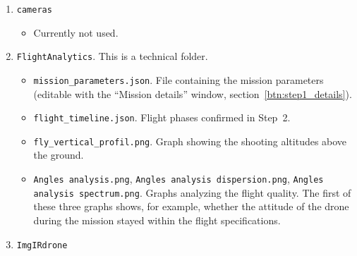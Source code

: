 \documentclass[a4paper,11pt]{report}
\begin{document}
\begin{enumerate}
\begin{itemize}
	      	\item \texttt{NIR}
	      	\begin{itemize}
	      		\item \texttt{NIR\_XXXX.dng}. Transferred and converted images from the infrared camera (proprietary RAW to dng),
	      		\item \texttt{NIR\_XXXX.exif}. ``Companion''~files of the images, containing exif data,
	      		\item \texttt{time\_line.json}. File giving the chronology of the images relative to the NIR camera clock,
	      		\item \texttt{transfer\_info\_NIR\_dng.json}. File summarizing the choices made in Step~2,
	      		\item \texttt{NIR\_XXXX\_RawTherapee.tif}. Images\textsuperscript{\ref{fn:rawtherapee_1}} created in Step~4.
	      		\end{itemize}
      		\item \texttt{shoot\_points.json}. Dictionary of the \emph{shoot points} (shots, using as reference the VIS image and the NIR image closest in time to the VIS shot). It is created in Step~3.
	    \end{itemize}
	\item \texttt{cameras}
	         \begin{itemize}
	         	\item Currently not used.
	         \end{itemize}
	\item \texttt{FlightAnalytics}. This is a technical folder.
			\begin{itemize}
				\item \texttt{mission\_parameters.json}. File containing the mission parameters (editable with the ``Mission details'' window, section~\ref{btn:step1_details}).
				\item \texttt{flight\_timeline.json}. Flight phases confirmed in Step~2.
				\item \texttt{fly\_vertical\_profil.png}. Graph showing the shooting altitudes above the ground.
				\item \texttt{Angles analysis.png},  \texttt{Angles analysis dispersion.png}, \texttt{Angles analysis spectrum.png}. Graphs analyzing the flight quality. The first of these three graphs shows, for example, whether the attitude of the drone during the mission stayed within the flight specifications.
			\end{itemize}
	\item \texttt{ImgIRdrone}

\end{enumerate}
\end{document}
